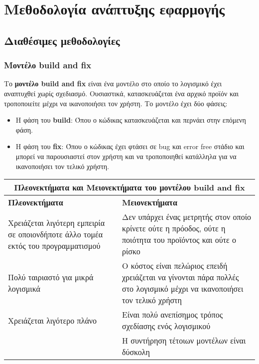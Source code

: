 \label{Chapter1}

\section{Μεθοδολογία ανάπτυξης εφαρμογής}

\subsection{Διαθέσιμες μεθοδολογίες}

\subsubsection{Μοντέλο build and fix}

Το \textbf{μοντέλο build and fix} είναι ένα μοντέλο στο οποίο το λογισμικό έχει 
αναπτυχθεί χωρίς σχεδιασμό. Ουσιαστικά, κατασκευάζεται ένα αρχικό προϊόν και τροποποιείτε
μέχρι να ικανοποιήσει τον χρήστη. Το μοντέλο έχει δύο φάσεις:

\begin{itemize}
    \item Η φάση του \textbf{build}: Όπου ο κώδικας κατασκευάζεται
    και περνάει στην επόμενη φάση.
    \item Η φάση του \textbf{fix}: Όπου ο κώδικας έχει φτάσει σε bug και 
    error free στάδιο και μπορεί να παρουσιαστεί στον χρήστη και να τροποποιηθεί 
    κατάλληλα για να ικανοποιήσει τον τελικό χρήστη. 
\end{itemize}

\begin{center}
    \begin{tabular}{| p{8cm} | p{8cm} |}
        \hline
        \multicolumn{2}{|c|}{\textbf{Πλεονεκτήματα και Μειονεκτήματα του μοντέλου build and fix}} \\
        \hline
        \textbf{Πλεονεκτήματα} & \textbf{Μειονεκτήματα} \\
        \hline
        Χρειάζεται λιγότερη εμπειρία σε οποιονδήποτε άλλο τομέα εκτός του προγραμματισμού & Δεν υπάρχει ένας μετρητής στον οποίο κρίνετε ούτε η πρόοδος, ούτε η ποιότητα του προϊόντος και ούτε ο ρίσκο \\
        \hline
        Πολύ ταιριαστό για μικρά λογισμικά &  Ο κόστος είναι πελώριος επειδή χρειάζεται να γίνονται πάρα πολλές στο λογισμικό μέχρι να ικανοποιήσει τον τελικό χρήστη \\
        \hline
        Χρειάζεται λιγότερο πλάνο & Είναι πολύ ανεπίσημος τρόπος σχεδίασης ενός λογισμικού \\
        \hline
        & Η συντήρηση τέτοιων μοντέλων είναι δύσκολη \\
        \hline
    \end{tabular}
\end{center}

